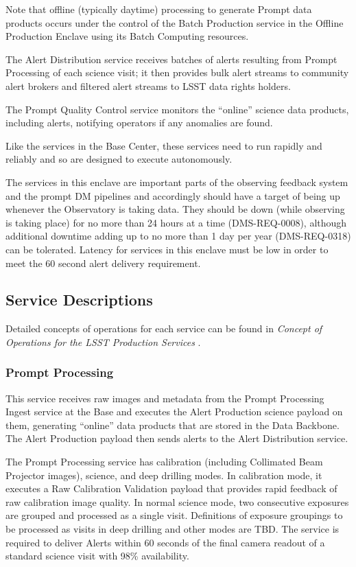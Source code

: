 \documentclass[DM,toc,lsstdraft]{lsstdoc}
\begin{document}
Note that offline (typically daytime) processing to generate Prompt data products occurs under the control of the Batch Production service in the Offline Production Enclave using its Batch Computing resources.

The Alert Distribution service receives batches of alerts resulting from Prompt Processing of each science visit; it then provides bulk alert streams to community alert brokers and filtered alert streams to LSST data rights holders.

The Prompt Quality Control service monitors the ``online'' science data
products, including alerts, notifying operators if any anomalies are
found.

Like the services in the Base Center, these services need to run
rapidly and reliably and so are designed to execute autonomously.

The services in this enclave are important parts of the observing feedback system and the prompt DM pipelines and accordingly should have a target of being up whenever the Observatory is taking data.
They should be down (while observing is taking place) for no more than 24 hours at a time (DMS-REQ-0008), although additional downtime adding up to no more than 1 day per year (DMS-REQ-0318) can be tolerated.
Latency for services in this enclave must be low in order to meet the 60 second alert delivery requirement.

\subsection{Service Descriptions}\label{prompt-us-service-descriptions}

Detailed concepts of operations for each service can be found in
\textit{Concept of Operations for the LSST Production Services} .

\subsubsection{Prompt Processing}\label{prompt-processing}

This service receives raw images and metadata from the
Prompt Processing Ingest service at the Base and executes the Alert
Production science payload on them, generating ``online'' data products
that are stored in the Data Backbone. The Alert Production payload then
sends alerts to the Alert Distribution service.

The Prompt Processing service has calibration (including Collimated Beam
Projector images), science, and deep drilling modes. In calibration
mode, it executes a Raw Calibration Validation payload that provides
rapid feedback of raw calibration image quality. In normal science mode,
two consecutive exposures are grouped and processed as a single visit.
Definitions of exposure groupings to be processed as visits in deep
drilling and other modes are TBD. The service is required to deliver
Alerts within 60 seconds of the final camera readout of a standard
science visit with 98\% availability.
\end{document}
